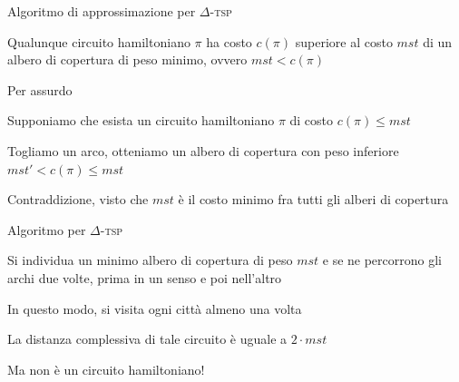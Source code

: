\begin{frame}{Algoritmo di approssimazione per $\Delta$-\textsc{tsp}}

\vspace{-9pt}
\begin{myboxtitle}[Teorema]
Qualunque circuito hamiltoniano $\pi$ ha costo $c(\pi)$ superiore al costo $\mathit{mst}$ di un albero di copertura di peso minimo, ovvero $\mathit{mst} < c(\pi)$
\end{myboxtitle}    

\begin{myboxtitle}[Dimostrazione]
Per assurdo
\BIL 
\item Supponiamo che esista un circuito hamiltoniano $\pi$ di costo $c(\pi) \leq \mathit{mst}$
\item Togliamo un arco, otteniamo un albero di copertura con peso inferiore
$\mathit{mst}' < c(\pi) \leq \mathit{mst}$
\item Contraddizione, visto che $\mathit{mst}$ è il costo minimo fra tutti gli alberi di copertura 
\EIL
\end{myboxtitle}

\end{frame}

\begin{frame}{Algoritmo per $\Delta$-\textsc{tsp}}

\vspace{-9pt}
\BIL
\item Si individua un minimo albero di copertura di peso $\mathit{mst}$ e se ne percorrono gli archi due volte, prima in un senso e poi nell'altro 
\item In questo modo, si visita ogni città almeno una volta
\item La distanza complessiva di tale circuito è uguale a $2 \cdot \mathit{mst}$
\item Ma non è un circuito hamiltoniano!
\EIL

\vspace{-12pt}

\end{frame}

